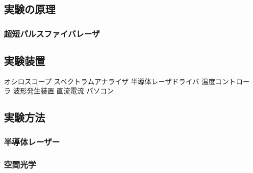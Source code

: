 \documentclass[titlepage]{jsarticle}
\begin{document}
\subsection{実験の原理}
\subsubsection{超短パルスファイバレーザ}

\subsection{実験装置}
オシロスコープ
スペクトラムアナライザ
半導体レーザドライバ
温度コントローラ
波形発生装置
直流電流
パソコン
\subsection{実験方法}
\subsubsection{半導体レーザー}



\subsubsection{空間光学}
\end{document}
